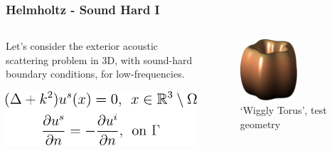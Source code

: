 \begin{frame}

    \frametitle{Helmholtz - Sound Hard I}

    \begin{columns}
        \begin{column}{0.5\textwidth}

            Let's consider the exterior acoustic scattering problem in 3D, with sound-hard
            boundary conditions, for low-frequencies.

            \hspace*{0.5pt}

            \centering
            \includegraphics[width=\textwidth]{assets/sound_hard_1.pdf}

        \end{column}

        \begin{column}{0.5\textwidth}
            \begin{center}
                \begin{figure}
                    \includegraphics[width=0.6\textwidth]{assets/wiggly_torus.pdf}
                    \caption{`Wiggly Torus', test geometry}
                \end{figure}
            \end{center}
        \end{column}
\end{columns}

\end{frame}

